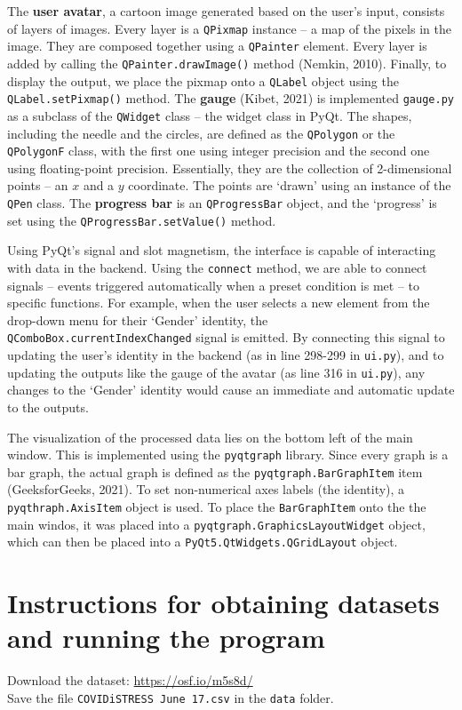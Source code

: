 \documentclass[fontsize=11pt]{article}
\begin{document}
    The \textbf{user avatar}, a cartoon image generated based on the user's input, consists of layers of images. Every layer is a \texttt{QPixmap} instance -- a map of the pixels in the image. They are composed together using a \texttt{QPainter} element. Every layer is added by calling the \texttt{QPainter.drawImage()} method (Nemkin, 2010). Finally, to display the output, we place the pixmap onto a \texttt{QLabel} object using the \texttt{QLabel.setPixmap()} method. The \textbf{gauge} (Kibet, 2021) is implemented \texttt{gauge.py} as a subclass of the \texttt{QWidget} class -- the widget class in PyQt. The shapes, including the needle and the circles, are defined as the \texttt{QPolygon} or the \texttt{QPolygonF} class, with the first one using integer precision and the second one using floating-point precision. Essentially, they are the collection of 2-dimensional points -- an $x$ and a $y$ coordinate. The points are `drawn' using an instance of the \texttt{QPen} class. The \textbf{progress bar} is an \texttt{QProgressBar} object, and the `progress' is set using the \texttt{QProgressBar.setValue()} method.

    Using PyQt's signal and slot magnetism, the interface is capable of interacting with data in the backend. Using the \texttt{connect} method, we are able to connect signals -- events triggered automatically when a preset condition is met -- to specific functions. For example, when the user selects a new element from the drop-down menu for their `Gender' identity, the \texttt{QComboBox.currentIndexChanged} signal is emitted. By connecting this signal to updating the user's identity in the backend (as in line 298-299 in \texttt{ui.py}), and to updating the outputs like the gauge of the avatar (as line 316 in \texttt{ui.py}), any changes to the `Gender' identity would cause an immediate and automatic update to the outputs.

    The visualization of the processed data lies on the bottom left of the main window. This is implemented using the \texttt{pyqtgraph} library. Since every graph is a bar graph, the actual graph is defined as the \texttt{pyqtgraph.BarGraphItem} item (GeeksforGeeks, 2021). To set non-numerical axes labels (the identity), a \texttt{pyqthraph.AxisItem} object is used. To place the \texttt{BarGraphItem} onto the the main windos, it was placed into a \texttt{pyqtgraph.GraphicsLayoutWidget} object, which can then be placed into a \texttt{PyQt5.QtWidgets.QGridLayout} object.

    \section*{Instructions for obtaining datasets and running the program}
    Download the dataset: \url{https://osf.io/m5s8d/} \\
    Save the file \texttt{COVIDiSTRESS June 17.csv} in the \texttt{data} folder. \\
\end{document}
